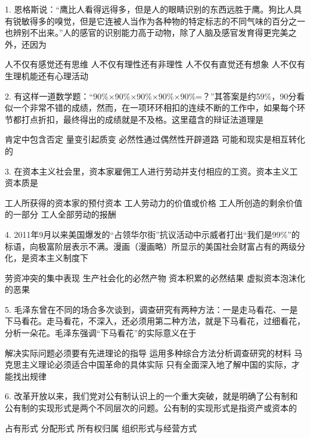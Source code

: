 1. 恩格斯说：“鹰比人看得远得多，但是人的眼睛识别的东西远胜于鹰。狗比人具有锐敏得多的嗅觉，但是它连被人当作为各种物的特定标志的不同气味的百分之一也辨别不出来。”人的感官的识别能力高于动物，除了人脑及感官发育得更完美之外，还因为
\begin{choices}
	 人不仅有感觉还有思维
	 人不仅有理性还有非理性
	 人不仅有直觉还有想象
	 人不仅有生理机能还有心理活动
\end{choices}

2. 有这样一道数学题：“90\%×90\%×90\%×90\%×90\%=？”其答案是约59\%，90分看似一个非常不错的成绩，然而，在一项环环相扣的连续不断的工作中，如果每个环节都打点折扣，最终得出的成绩就是不及格。这里蕴含的辩证法道理是
\begin{choices}
	 肯定中包含否定
	 量变引起质变
	 必然性通过偶然性开辟道路
	 可能和现实是相互转化的
\end{choices}

3. 在资本主义社会里，资本家雇佣工人进行劳动并支付相应的工资。资本主义工资本质是
\begin{choices}
	 工人所获得的资本家的预付资本
	 工人劳动力的价值或价格
	 工人所创造的剩余价值的一部分
	 工人全部劳动的报酬
\end{choices}

4. 2011年9月以来美国爆发的“占领华尔街”抗议活动中示威者打出“我们是99\%”的标语，向极富阶层表示不满。漫画（漫画略）所显示的美国社会财富占有的两级分化，是资本主义制度下
\begin{choices}
	 劳资冲突的集中表现
	 生产社会化的必然产物
	 资本积累的必然结果
	 虚拟资本泡沫化的恶果
\end{choices}

5. 毛泽东曾在不同的场合多次谈到，调查研究有两种方法：一是走马看花、一是下马看花。走马看花，不深入，还必须用第二种方法，就是下马看花，过细看花，分析一朵花。毛泽东强调“下马看花”的实际意义在于
\begin{choices}
	 解决实际问题必须要有先进理论的指导
	 运用多种综合方法分析调查研究的材料
	 马克思主义理论必须适合中国革命的具体实际
	 只有全面深入地了解中国的实际，才能找出规律
\end{choices}

6. 改革开放以来，我们党对公有制认识上的一个重大突破，就是明确了公有制和公有制的实现形式是两个不同层次的问题。公有制的实现形式是指资产或资本的
\begin{choices}
	 占有形式
	 分配形式
	 所有权归属
	 组织形式与经营方式
\end{choices}

